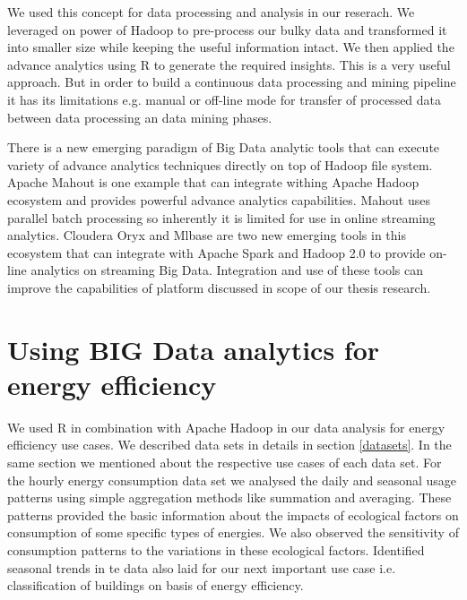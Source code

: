 We used this concept for data processing and analysis in our reserach. We leveraged on power of Hadoop to pre-process our bulky data and transformed it into smaller size while keeping the useful information intact. We then applied the advance analytics using R to generate the required insights. This is a very useful approach. But in order to build a continuous data processing and mining pipeline it has its limitations e.g. manual or off-line mode for transfer of processed data between data processing an data mining phases. 

There is a new emerging paradigm of Big Data analytic tools that can execute variety of advance analytics techniques directly on top of Hadoop file system. Apache Mahout is one example that can integrate withing Apache Hadoop ecosystem and provides powerful advance analytics capabilities. Mahout uses parallel batch processing so inherently it is limited for use in online streaming analytics. Cloudera Oryx and Mlbase are two new emerging tools in this ecosystem that can integrate with Apache Spark and Hadoop 2.0 to provide on-line analytics on streaming Big Data. Integration and use of these tools can improve the capabilities of platform discussed in scope of our thesis research.     

\section{Using BIG Data analytics for energy efficiency}
We used R in combination with Apache Hadoop in our data analysis for energy efficiency use cases. We described data sets in details in section \ref{datasets}. In the same section we mentioned about the respective use cases of each data set.  For the hourly energy consumption data set we analysed the daily and seasonal usage patterns using simple aggregation methods like summation and averaging. These patterns provided the basic information about the impacts of ecological factors on consumption of some specific types of energies. We also observed the sensitivity of consumption patterns to the variations in these ecological factors. Identified seasonal trends in te data also laid for our next important use case i.e. classification of buildings on basis of energy efficiency. 

